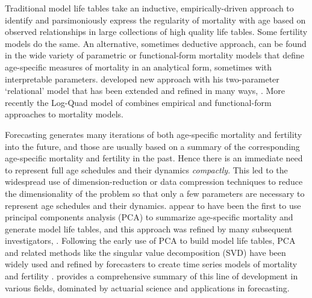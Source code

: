 \documentclass[11pt]{article}
\begin{document}
Traditional model life tables \citep[e.g.][]{united1955age, ledermann1969nouvelles, coale1966, united1982model, murray2003, wilmoth2012flexible, Wang2013} take an inductive, empirically-driven approach to identify and parsimoniously express the regularity of mortality with age based on observed relationships in large collections of high quality life tables.  Some fertility models \citep[e.g.][]{coale1974model, lee1993modeling} do the same.  An alternative, sometimes deductive approach, can be found in the wide variety of  parametric or functional-form mortality models \cite[e.g.][]{gompertz1825nature, makeham1860law, heligman1980, li2009vitality} that define age-specific measures of mortality in an analytical form, sometimes with interpretable parameters. \cite{brass1971scale} developed  new approach with his two-parameter `relational' model that has been extended and refined in many ways, \citep[for example][]{zaba1979four, murray2003}.  More recently the Log-Quad model of \cite{wilmoth2012flexible} combines empirical and functional-form approaches to mortality models.

   Forecasting generates many iterations of both age-specific mortality and fertility into the future, and those are usually based on a summary of the corresponding age-specific mortality and fertility in the past.  Hence there is an immediate need to represent full age schedules and their dynamics \textit{compactly}.  This led to the widespread use of dimension-reduction or data compression techniques to reduce the dimensionality of the problem so that only a few parameters are necessary to represent age schedules and their dynamics.  \cite{ledermannBreas1959} appear to have been the first to use principal components analysis (PCA) to summarize age-specific mortality and generate model life tables, and this approach was refined by many subsequent investigators, \citep[e.g.][]{bourgeois1962factor, bourgeois1990application, ledermann1969nouvelles, united1982model}. Following the early use of PCA to build model life tables, PCA and related methods like the singular value decomposition (SVD) \citep[e.g.][]{good1969some, stewart1993early, strang2009introduction} have been widely used and refined by forecasters to create time series models of mortality and fertility \citep[e.g.][]{bozik1987forecasting, lee1992modeling, lee1993modeling}.  \cite{bell1997comparing} provides a comprehensive summary of this line of development in various fields, dominated by actuarial science and applications in forecasting.
\end{document}
